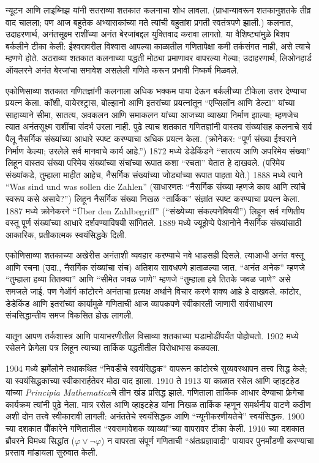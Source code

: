 न्यूटन आणि लाइब्निझ यांनी सतराव्या शतकात कलनाचा शोध लावला. (प्राधान्यावरून
शतकानुशतके तीव्र वाद चालला; पण आज बहुतेक अभ्यासकांच्या मते त्यांची
बहुतांश प्रगती स्वतंत्रपणे झाली.) कलनात, उदाहरणार्थ, अनंतसूक्ष्म
राशींच्या अनंत बेरजांबद्दल युक्तिवाद करावा लागतो. या वैशिष्ट्यांमुळे
बिशप बर्कलीने टीका केली: ईश्वरावरील विश्वास आपल्या काळातील गणितापेक्षा
कमी तर्कसंगत नाही, असे त्याचे म्हणणे होते. अठराव्या शतकात कलनाच्या
पद्धती मोठ्या प्रमाणावर वापरल्या गेल्या; उदाहरणार्थ, लिओनहार्ड
ऑयलरने अनंत बेरजांचा समावेश असलेली गणिते करून प्रभावी निष्कर्ष मिळवले.

एकोणिसाव्या शतकात गणितज्ञांनी कलनाला अधिक भक्कम पाया देऊन बर्कलीच्या
टीकेला उत्तर देण्याचा प्रयत्न केला. कॉशी, वायेरश्ट्रास, बोल्झानो आणि
इतरांच्या प्रयत्नांतून ``एप्सिलॉन आणि डेल्टा'' यांच्या साहाय्याने सीमा,
सातत्य, अवकलन आणि समाकलन यांच्या आजच्या व्याख्या निर्माण झाल्या; म्हणजेच
त्यात अनंतसूक्ष्म राशींचा संदर्भ उरला नाही. पुढे त्याच शतकात गणितज्ञांनी
वास्तव संख्यांसह कलनाचे सर्व पैलू नैसर्गिक संख्यांच्या आधारे स्पष्ट
करण्याचा अधिक प्रयत्न केला. (क्रोनेकर: ``पूर्ण संख्या ईश्वराने निर्माण
केल्या; उरलेले सर्व मानवाचे कार्य आहे.'') 1872 मध्ये डेडेकिंडने
``सातत्य आणि अपरिमेय संख्या'' लिहून वास्तव संख्या परिमेय संख्यांच्या
संचांच्या रूपात कशा ``रचता'' येतात हे दाखवले. (परिमेय संख्यांकडे, तुम्हाला
माहीत आहेच, नैसर्गिक संख्यांच्या जोड्यांच्या रूपात पाहता येते.) 1888 मध्ये
त्याने ``Was sind und was sollen die Zahlen'' (साधारणतः ``नैसर्गिक
संख्या म्हणजे काय आणि त्यांचे स्वरूप कसे असावे?'') लिहून नैसर्गिक संख्या
निखळ ``तार्किक'' संज्ञांत स्पष्ट करण्याचा प्रयत्न केला. 1887 मध्ये
क्रोनेकरने ``\"Uber den Zahlbegriff'' (``संख्येच्या संकल्पनेविषयी'')
लिहून सर्व गणितीय वस्तू पूर्ण संख्यांच्या आधारे दर्शवण्याविषयी सांगितले.
1889 मध्ये ज्यूझेप्पे पेआनोने नैसर्गिक संख्यांसाठी आकारिक, प्रतीकात्मक
स्वयंसिद्धके दिली.

एकोणिसाव्या शतकाच्या अखेरीस अनंताशी व्यवहार करण्याचे नवे धाडसही दिसले.
त्याआधी अनंत वस्तू आणि रचना (उदा., नैसर्गिक संख्यांचा संच) अतिशय
सावधपणे हाताळल्या जात. ``अनंत अनेक'' म्हणजे ``तुम्हाला हव्या तितक्या''
आणि ``सीमेत जवळ जाणे'' म्हणजे ``तुम्हाला हवे तितके जवळ जाणे'' असे समजले
जाई. पण गेऑर्ग कांटोरने अनंताचा प्रत्यक्ष अर्थाने विचार करणे शक्य आहे हे
दाखवले. कांटोर, डेडेकिंड आणि इतरांच्या कार्यामुळे गणिताची आज व्यापकपणे
स्वीकारली जाणारी सर्वसाधारण संचसिद्धान्तीय समज विकसित होऊ लागली.

यातून आपण तर्कशास्त्र आणि पायाभरणीतील विसाव्या शतकाच्या घडामोडींपर्यंत
पोहोचतो. 1902 मध्ये रसेलने फ्रेगेला पत्र लिहून त्याच्या तार्किक पद्धतीतील
विरोधाभास कळवला.

1904 मध्ये झर्मेलोने तथाकथित ``निवडीचे स्वयंसिद्धक'' वापरून कांटोरचे
सुव्यवस्थापन तत्त्व सिद्ध केले; या स्वयंसिद्धकाच्या स्वीकारार्हतेवर मोठा वाद
झाला. 1910 ते 1913 या काळात रसेल आणि व्हाइटहेड यांच्या \emph{Principia
  Mathematica}चे तीन खंड प्रसिद्ध झाले. गणिताला तार्किक आधार देण्याचा
फ्रेगेचा कार्यक्रम त्यांनी पुढे नेला. मात्र रसेल आणि व्हाइटहेड यांना
निखळ तार्किक म्हणून समर्थनीय वाटणे कठीण अशी दोन तत्त्वे स्वीकारावी
लागली: अनंततेचे स्वयंसिद्धक आणि ``न्यूनीकरणीयतेचे'' स्वयंसिद्धक. 1900
च्या दशकात पॉँकारेने गणितातील ``स्वसमावेशक व्याख्यां''च्या वापरावर
टीका केली. 1910 च्या दशकात ब्रौवरने विमध्य सिद्धांत
($\varphi \lor \lnot \varphi$) न वापरता संपूर्ण गणिताची ``अंतःप्रज्ञावादी''
पायावर पुनर्मांडणी करण्याचा प्रस्ताव मांडायला सुरुवात केली.

